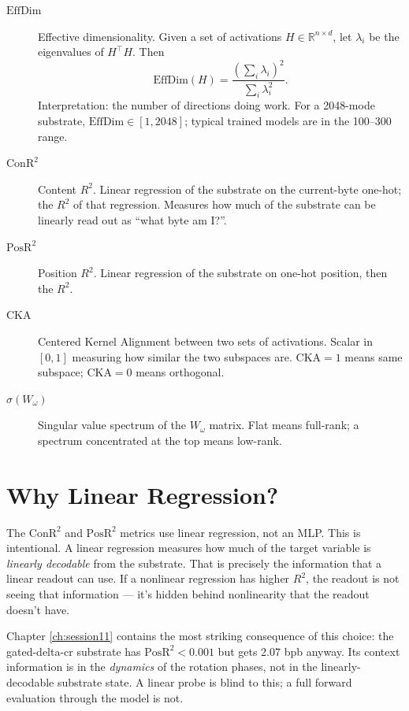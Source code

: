 \documentclass[11pt,openany]{book}
\theoremstyle{definition}
\theoremstyle{plain}
\newcommand{\effdim}{\mathrm{EffDim}}
\newcommand{\conr}{\mathrm{ConR^2}}
\newcommand{\posr}{\mathrm{PosR^2}}
\newcommand{\cka}{\mathrm{CKA}}
\newcommand{\omegaproj}{W_\omega}
\begin{document}
\begin{description}
  \item[$\effdim$] Effective dimensionality. Given a set of activations
    $H \in \mathbb{R}^{n \times d}$, let $\lambda_i$ be the eigenvalues
    of $H^\top H$. Then
    \begin{equation}
      \effdim(H) = \frac{(\sum_i \lambda_i)^2}{\sum_i \lambda_i^2}.
    \end{equation}
    Interpretation: the number of directions doing work. For a 2048-mode
    substrate, $\effdim \in [1, 2048]$; typical trained models are in
    the 100--300 range.
  \item[$\conr$] Content $R^2$. Linear regression of the substrate on
    the current-byte one-hot; the $R^2$ of that regression. Measures
    how much of the substrate can be linearly read out as ``what byte
    am I?''.
  \item[$\posr$] Position $R^2$. Linear regression of the substrate on
    one-hot position, then the $R^2$.
  \item[$\cka$] Centered Kernel Alignment between two sets of activations.
    Scalar in $[0, 1]$ measuring how similar the two subspaces are.
    $\cka = 1$ means same subspace; $\cka = 0$ means orthogonal.
  \item[$\sigma(\omegaproj)$] Singular value spectrum of the
    $\omegaproj$ matrix. Flat means full-rank; a spectrum concentrated
    at the top means low-rank.
\end{description}

\section{Why Linear Regression?}

The $\conr$ and $\posr$ metrics use linear regression, not an MLP. This
is intentional. A linear regression measures how much of the target
variable is \emph{linearly decodable} from the substrate. That is
precisely the information that a linear readout can use. If a nonlinear
regression has higher $R^2$, the readout is not seeing that information
--- it's hidden behind nonlinearity that the readout doesn't have.

Chapter \ref{ch:session11} contains the most striking consequence of this
choice: the gated-delta-cr substrate has $\posr < 0.001$ but gets 2.07
bpb anyway. Its context information is in the \emph{dynamics} of the
rotation phases, not in the linearly-decodable substrate state. A linear
probe is blind to this; a full forward evaluation through the model is
not.
\end{document}
